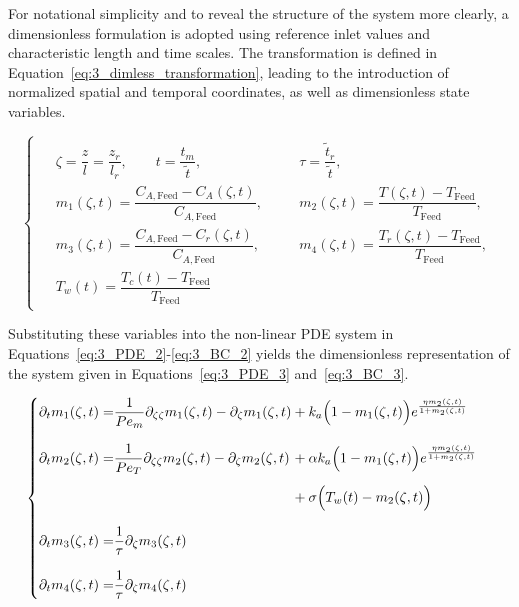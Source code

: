For notational simplicity and to reveal the structure of the system more clearly, a dimensionless formulation is adopted using reference inlet values and characteristic length and time scales. The transformation is defined in Equation~\eqref{eq:3_dimless_transformation}, leading to the introduction of normalized spatial and temporal coordinates, as well as dimensionless state variables. 

\begin{equation} \label{eq:3_dimless_transformation}
\begin{cases}
    \begin{alignedat}{2}
        &\zeta = \dfrac{z}{l} = \dfrac{z_r}{l_r}, \qquad 
        t = \dfrac{t_m}{\tilde{t}}, \qquad
        &&\tau = \dfrac{\tilde{t}_r}{\tilde{t}}, \\[2.0ex]
        &m_1(\zeta, t) = \dfrac{C_{A, \text{Feed}} - C_{A}(\zeta, t)}{C_{A, \text{Feed}}}, \quad 
        &&m_2(\zeta, t) = \dfrac{T(\zeta, t) - T_{\text{Feed}}}{T_{\text{Feed}}}, \\[1.5ex]
        &m_3(\zeta, t) = \dfrac{C_{A, \text{Feed}} - C_r(\zeta, t)}{C_{A, \text{Feed}}}, \quad 
        &&m_4(\zeta, t) = \dfrac{T_r(\zeta, t) - T_{\text{Feed}}}{T_{\text{Feed}}}, \\[1.5ex]
        &T_w(t) = \dfrac{T_c(t) - T_{\text{Feed}}}{T_{\text{Feed}}}
    \end{alignedat}
\end{cases}
\end{equation}

Substituting these variables into the non-linear PDE system in Equations~\eqref{eq:3_PDE_2}-\eqref{eq:3_BC_2} yields the dimensionless representation of the system given in Equations~\eqref{eq:3_PDE_3} and~\eqref{eq:3_BC_3}. 


\begin{equation} \label{eq:3_PDE_3}
\begin{cases}
\begin{alignedat}{2}
    \partial_{t} m_1(\zeta, t) = &\dfrac{1}{Pe_m} \partial_{\zeta\zeta} m_1(\zeta, t) 
    -\partial_{\zeta} m_1(\zeta, t) 
    &&+ k_a \Bigl( 1 - m_1(\zeta, t) \Bigr) e^{\frac{\eta m_2(\zeta, t)}{1 + m_2(\zeta, t)}} \\[2.0ex]

    \partial_{t} m_2(\zeta, t) = &\dfrac{1}{Pe_T} \partial_{\zeta\zeta} m_2(\zeta, t) 
    -\partial_{\zeta} m_2(\zeta, t)
    &&+ \alpha k_a \Bigl( 1 - m_1(\zeta, t) \Bigr) e^{\frac{\eta m_2(\zeta, t)}{1 + m_2(\zeta, t)}} \\[1.2ex]
    &&&+ \sigma \Bigl( T_w(t) - m_2(\zeta, t)\Bigr) \\[2.0ex]

    \partial_{t} m_3(\zeta, t) = &\frac{1}{\tau} \partial_{\zeta} m_3(\zeta, t) \\[2.0ex]

    \partial_{t} m_4(\zeta, t) = &\frac{1}{\tau} \partial_{\zeta} m_4(\zeta, t)
\end{alignedat}
\end{cases}
\end{equation}

